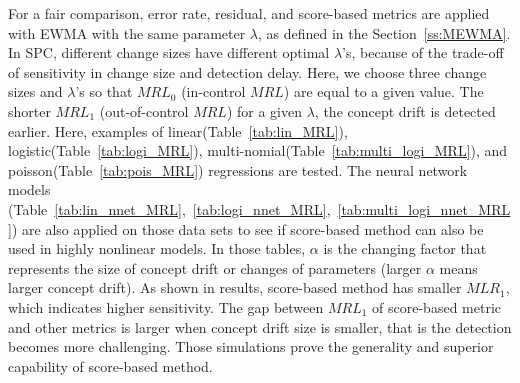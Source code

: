 \documentclass[twoside,11pt]{article}
\begin{document}
For a fair comparison, error rate, residual, and score-based metrics are applied with EWMA with the same parameter $\lambda$, as defined in the Section~\ref{ss:MEWMA}. In SPC, different change sizes have different optimal $ \lambda$'s, because of the trade-off of sensitivity in change size and detection delay. Here, we choose three change sizes and $ \lambda$'s so that $MRL_0$ (in-control $MRL$) are equal to a given value. The shorter $MRL_1$ (out-of-control $MRL$) for a given $ \lambda$, the concept drift is detected earlier. Here, examples of linear(Table~\ref{tab:lin_MRL}), logistic(Table~\ref{tab:logi_MRL}), multi-nomial(Table~\ref{tab:multi_logi_MRL}), and poisson(Table~\ref{tab:pois_MRL}) regressions are tested. The neural network models (Table~\ref{tab:lin_nnet_MRL},~\ref{tab:logi_nnet_MRL},~\ref{tab:multi_logi_nnet_MRL}) are also applied on those data sets to see if score-based method can also be used in highly nonlinear models. In those tables, $ \alpha$ is the changing factor that represents the size of concept drift or changes of parameters (larger $ \alpha$ means larger concept drift). As shown in results, score-based method has smaller $MLR_1$, which indicates higher sensitivity. The gap between $MRL_1$ of score-based metric and other metrics is larger when concept drift size is smaller, that is the detection becomes more challenging. Those simulations prove the generality and superior capability of score-based method.
\end{document}
